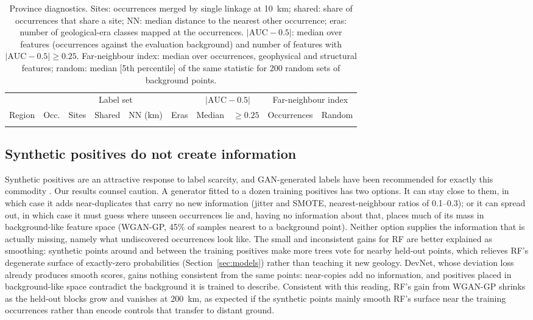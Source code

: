 \documentclass[pdflatex,sn-apa]{sn-jnl}
\begin{document}
\begin{table}[t]
\caption{Province diagnostics. Sites: occurrences merged by single linkage at 10~km; shared: share of occurrences that share a site; NN: median distance to the nearest other occurrence; eras: number of geological-era classes mapped at the occurrences. $|\mathrm{AUC}-0.5|$: median over features (occurrences against the evaluation background) and number of features with $|\mathrm{AUC}-0.5| \geq 0.25$. Far-neighbour index: median over occurrences, geophysical and structural features; random: median [5th percentile] of the same statistic for 200 random sets of background points.}\label{tab:region-diag}
\scriptsize
\setlength{\tabcolsep}{2.5pt}
\begin{tabular*}{\textwidth}{@{\extracolsep\fill}lccccccccc}
\toprule
 & \multicolumn{5}{c}{Label set} & \multicolumn{2}{c}{$|\mathrm{AUC}-0.5|$} & \multicolumn{2}{c}{Far-neighbour index} \\
\cmidrule(lr){2-6}\cmidrule(lr){7-8}\cmidrule(lr){9-10}
Region & Occ. & Sites & Shared & NN (km) & Eras & Median & $\geq 0.25$ & Occurrences & Random \\
\midrule
\botrule
\end{tabular*}
\end{table}

\subsection{Synthetic positives do not create information}\label{sec:disc-gan}

Synthetic positives are an attractive response to label scarcity, and GAN-generated labels have been recommended for exactly this commodity \citep{Parsa2025}. Our results counsel caution. A generator fitted to a dozen training positives has two options. It can stay close to them, in which case it adds near-duplicates that carry no new information (jitter and SMOTE, nearest-neighbour ratios of 0.1--0.3); or it can spread out, in which case it must guess where unseen occurrences lie and, having no information about that, places much of its mass in background-like feature space (WGAN-GP, 45\% of samples nearest to a background point). Neither option supplies the information that is actually missing, namely what undiscovered occurrences look like. The small and inconsistent gains for RF are better explained as smoothing: synthetic points around and between the training positives make more trees vote for nearby held-out points, which relieves RF's degenerate surface of exactly-zero probabilities (Section~\ref{sec:models}) rather than teaching it new geology. DevNet, whose deviation loss already produces smooth scores, gains nothing consistent from the same points: near-copies add no information, and positives placed in background-like space contradict the background it is trained to describe. Consistent with this reading, RF's gain from WGAN-GP shrinks as the held-out blocks grow and vanishes at 200~km, as expected if the synthetic points mainly smooth RF's surface near the training occurrences rather than encode controls that transfer to distant ground.
\end{document}
